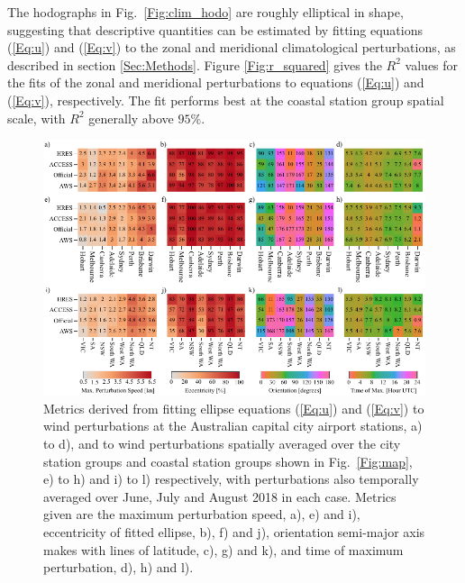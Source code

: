 \documentclass{ametsoc}
\begin{document}
The hodographs in Fig.~\ref{Fig:clim_hodo} are roughly elliptical in shape, suggesting that descriptive quantities can be estimated by fitting equations (\ref{Eq:u}) and (\ref{Eq:v}) to the zonal and meridional climatological perturbations, as described in section \ref{Sec:Methods}. Figure \ref{Fig:r_squared} gives the $R^2$ values for the fits of the zonal and meridional perturbations to equations (\ref{Eq:u}) and (\ref{Eq:v}), respectively. The fit performs best at the coastal station group spatial scale, with $R^2$ generally above $95\%$. 

\begin{figure}
\centering
\includegraphics[width=39pc]{ellipse_fits.pdf}
\caption{Metrics derived from fitting ellipse equations (\ref{Eq:u}) and (\ref{Eq:v}) to wind perturbations at the Australian capital city airport stations, a) to d), and to wind perturbations spatially averaged over the city station groups and coastal station groups shown in Fig.~\ref{Fig:map}, e) to h) and i) to l) respectively, with perturbations also temporally averaged over June, July and August 2018 in each case. Metrics given are the maximum perturbation speed, a), e) and i), eccentricity of fitted ellipse, b), f) and j), orientation semi-major axis makes with lines of latitude, c), g) and k), and time of maximum perturbation, d), h) and l).}
\label{Fig:ellipse_fits}
\end{figure}
\end{document}
